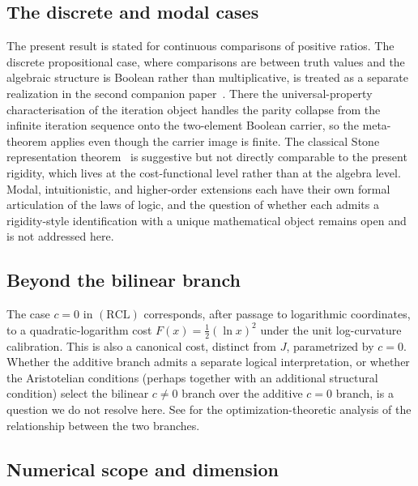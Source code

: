 \documentclass[11pt,a4paper]{article}
\theoremstyle{definition}
\theoremstyle{remark}
\begin{document}
\subsection{The discrete and modal cases}

The present result is stated for continuous comparisons of positive ratios.
The discrete propositional case, where comparisons are between truth
values and the algebraic structure is Boolean rather than
multiplicative, is treated as a separate realization in the second
companion paper~\cite{Washburn2026UniversalForcing}. There the
universal-property characterisation of the iteration object handles
the parity collapse from the infinite iteration sequence onto the
two-element Boolean carrier, so the meta-theorem applies even though
the carrier image is finite. The classical Stone representation
theorem~\cite{Stone1936} is suggestive but not directly comparable to
the present rigidity, which lives at the cost-functional level rather
than at the algebra level. Modal, intuitionistic, and higher-order
extensions each have their own formal articulation of the laws of
logic, and the question of whether each admits a rigidity-style
identification with a unique mathematical object remains open and is
not addressed here.

\subsection{Beyond the bilinear branch}\label{subsec:additive-branch}

The case $c = 0$ in $(\mathrm{RCL})$ corresponds, after passage to
logarithmic coordinates, to a quadratic-logarithm cost
$F(x) = \tfrac{1}{2}(\ln x)^2$ under the unit log-curvature calibration.
This is also a canonical cost, distinct from $J$, parametrized by $c = 0$.
Whether the additive branch admits a separate logical interpretation, or
whether the Aristotelian conditions (perhaps together with an additional
structural condition) select the bilinear $c \neq 0$ branch over the
additive $c = 0$ branch, is a question we do not resolve here. See
\cite[Section~3]{WashburnRahnamai2026} for the optimization-theoretic
analysis of the relationship between the two branches.

\subsection{Numerical scope and dimension}
\end{document}
